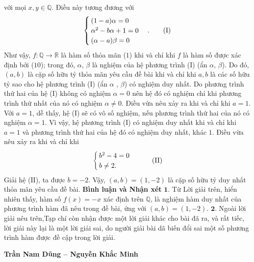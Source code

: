 \begin{multicols}{2}
\begin{align*}
	\end{align*}
	với mọi $x,y \in \mathbb{Q}$.
	\vskip 0.05cm
	Điều này tương đương với
	\begin{align*}
		\begin{cases}
			(1-a)\alpha = 0\\
			\alpha^2 - b\alpha + 1 = 0\\
			(\alpha - a)\beta = 0
		\end{cases} . \tag{$\text{I}$}
	\end{align*}
	Như vậy, $f: \mathbb{Q} \to \mathbb{R}$  là hàm số thỏa mãn ($1$) khi và chỉ khi $f$  là hàm số được xác định bởi ($10$); trong đó, $\alpha$, $\beta$  là nghiệm của hệ phương trình ($\text{I}$) (ẩn  $\alpha$, $\beta$).
	\vskip 0.05cm
	Do đó, $(a, b)$ là cặp số hữu tỷ thỏa mãn yêu cầu đề bài khi và chỉ khi $a, b$ là các số hữu tỷ sao cho hệ phương trình ($\text{I}$) (ẩn  $\alpha$ , $\beta$) có nghiệm duy nhất.
	\vskip 0.05cm
	Do phương trình thứ hai của hệ ($\text{I}$) không có nghiệm $\alpha = 0$  nên hệ đó có nghiệm chỉ khi phương trình thứ nhất của nó có nghiệm  $\alpha \ne 0$. Điều vừa nêu xảy ra khi và chỉ khi $a = 1$.
	\vskip 0.05cm
	Với $a = 1$, dễ thấy, hệ ($\text{I}$) sẽ có vô số nghiệm, nếu phương trình thứ hai của nó có nghiệm $\alpha = 1$.
	\vskip 0.05cm 
	Vì vậy, hệ phương trình ($\text{I}$) có nghiệm duy nhất khi và chỉ khi $a = 1$ và phương trình thứ hai của hệ đó có nghiệm duy nhất, khác $1$. Điều vừa nêu xảy ra khi và chỉ khi
	\begin{align*}
		\begin{cases}
			b^2 - 4 = 0\\
			b \ne 2.
		\end{cases}\tag{$\text{II}$}
	\end{align*}
	Giải hệ ($\text{II}$), ta được $b = -2$.
	\vskip 0.05cm
	Vậy, $(a,b) = (1, -2)$  là cặp số hữu tỷ duy nhất thỏa mãn yêu cầu đề bài.
	\vskip 0.05cm
	\textbf{\color{thachthuctoanhoc}Bình luận và Nhận xét}
	\vskip 0.05cm
	$\pmb{1.}$ Từ Lời giải trên, hiển nhiên thấy, hàm số $f(x) = -x$  xác định trên  $\mathbb{Q}$, là nghiệm hàm duy nhất của phương trình hàm đã nêu trong đề bài, ứng với  $(a,b) = (1,-2)$.
	\vskip 0.05cm
	$\pmb{2.}$ Ngoài lời giải nêu trên,Tạp chí còn nhận được một lời giải khác cho bài đã ra, và rất tiếc, lời giải này lại là một lời giải sai, do người giải bài dã biến đổi sai một số phương trình hàm được đề cập trong lời giải.
	\begin{flushright}
		\textbf{\color{thachthuctoanhoc}Trần Nam Dũng -- Nguyễn Khắc Minh}
	\end{flushright}

\end{multicols}
